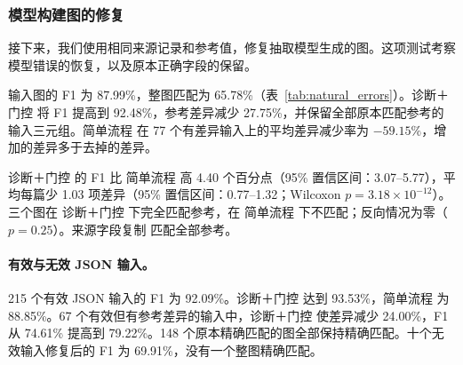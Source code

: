 \subsubsection{模型构建图的修复}
\label{sec:eval:natural}

接下来，我们使用相同来源记录和参考值，修复抽取模型生成的图。这项测试考察模型错误的恢复，以及原本正确字段的保留。

输入图的 F1 为 87.99\%，整图匹配为 65.78\%（表~\ref{tab:natural_errors}）。诊断＋门控 将 F1 提高到 92.48\%，参考差异减少 27.75\%，并保留全部原本匹配参考的输入三元组。简单流程 在 77 个有差异输入上的平均差异减少率为 $-59.15\%$，增加的差异多于去掉的差异。

诊断＋门控 的 F1 比 简单流程 高 4.40 个百分点（95\% 置信区间：3.07--5.77），平均每篇少 1.03 项差异（95\% 置信区间：0.77--1.32；Wilcoxon $p=3.18\times10^{-12}$）。三个图在 诊断＋门控 下完全匹配参考，在 简单流程 下不匹配；反向情况为零（$p=0.25$）。来源字段复制 匹配全部参考。

\begin{table}[t]
\centering
\caption{模型构建图的修复。差异减少率使用 77 个与参考不同的输入，其余分数使用全部 225 篇文档。}
\label{tab:natural_errors}
\small
{}
\end{table}

\paragraph{有效与无效 JSON 输入。}
215 个有效 JSON 输入的 F1 为 92.09\%。诊断＋门控 达到 93.53\%，简单流程 为 88.85\%。67 个有效但有参考差异的输入中，诊断＋门控 使差异减少 24.00\%，F1 从 74.61\% 提高到 79.22\%。148 个原本精确匹配的图全部保持精确匹配。十个无效输入修复后的 F1 为 69.91\%，没有一个整图精确匹配。

